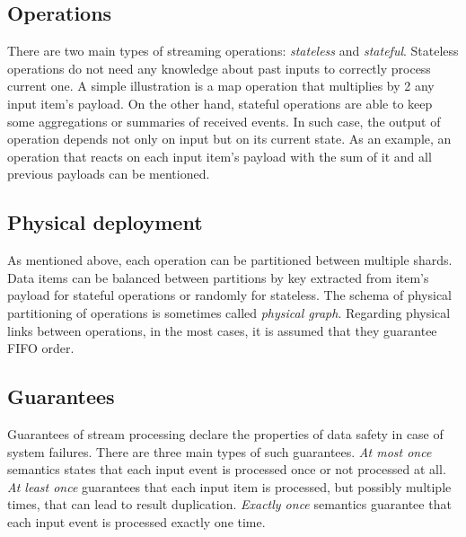 \subsection{Operations}
There are two main types of streaming operations: {\it stateless} and {\it stateful}. Stateless operations do not need any knowledge about past inputs to correctly process current one. A simple illustration is a map operation that multiplies by 2 any input item's payload. On the other hand, stateful operations are able to keep some aggregations or summaries of received events. In such case, the output of operation depends not only on input but on its current state. As an example, an operation that reacts on each input item's payload with the sum of it and all previous payloads can be mentioned. 

\subsection{Physical deployment}
As mentioned above, each operation can be partitioned between multiple shards. Data items can be balanced between partitions by key extracted from item's payload for stateful operations or randomly for stateless. The schema of physical partitioning of operations is sometimes called {\it physical graph}. Regarding physical links between operations, in the most cases, it is assumed that they guarantee FIFO order.

\subsection{Guarantees}
Guarantees of stream processing declare the properties of data safety in case of system failures. There are three main types of such guarantees. {\it At most once} semantics states that each input event is processed once or not processed at all. {\it At least once} guarantees that each input item is processed, but possibly multiple times, that can lead to result duplication. {\it Exactly once} semantics guarantee that each input event is processed exactly one time.  


